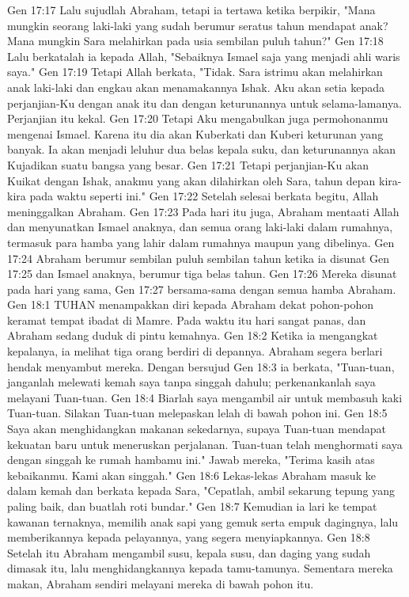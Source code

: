 Gen 17:17  Lalu sujudlah Abraham, tetapi ia tertawa ketika berpikir, "Mana mungkin seorang laki-laki yang sudah berumur seratus tahun mendapat anak? Mana mungkin Sara melahirkan pada usia sembilan puluh tahun?"
Gen 17:18  Lalu berkatalah ia kepada Allah, "Sebaiknya Ismael saja yang menjadi ahli waris saya."
Gen 17:19  Tetapi Allah berkata, "Tidak. Sara istrimu akan melahirkan anak laki-laki dan engkau akan menamakannya Ishak. Aku akan setia kepada perjanjian-Ku dengan anak itu dan dengan keturunannya untuk selama-lamanya. Perjanjian itu kekal.
Gen 17:20  Tetapi Aku mengabulkan juga permohonanmu mengenai Ismael. Karena itu dia akan Kuberkati dan Kuberi keturunan yang banyak. Ia akan menjadi leluhur dua belas kepala suku, dan keturunannya akan Kujadikan suatu bangsa yang besar.
Gen 17:21  Tetapi perjanjian-Ku akan Kuikat dengan Ishak, anakmu yang akan dilahirkan oleh Sara, tahun depan kira-kira pada waktu seperti ini."
Gen 17:22  Setelah selesai berkata begitu, Allah meninggalkan Abraham.
Gen 17:23  Pada hari itu juga, Abraham mentaati Allah dan menyunatkan Ismael anaknya, dan semua orang laki-laki dalam rumahnya, termasuk para hamba yang lahir dalam rumahnya maupun yang dibelinya.
Gen 17:24  Abraham berumur sembilan puluh sembilan tahun ketika ia disunat
Gen 17:25  dan Ismael anaknya, berumur tiga belas tahun.
Gen 17:26  Mereka disunat pada hari yang sama,
Gen 17:27  bersama-sama dengan semua hamba Abraham.
Gen 18:1  TUHAN menampakkan diri kepada Abraham dekat pohon-pohon keramat tempat ibadat di Mamre. Pada waktu itu hari sangat panas, dan Abraham sedang duduk di pintu kemahnya.
Gen 18:2  Ketika ia mengangkat kepalanya, ia melihat tiga orang berdiri di depannya. Abraham segera berlari hendak menyambut mereka. Dengan bersujud
Gen 18:3  ia berkata, "Tuan-tuan, janganlah melewati kemah saya tanpa singgah dahulu; perkenankanlah saya melayani Tuan-tuan.
Gen 18:4  Biarlah saya mengambil air untuk membasuh kaki Tuan-tuan. Silakan Tuan-tuan melepaskan lelah di bawah pohon ini.
Gen 18:5  Saya akan menghidangkan makanan sekedarnya, supaya Tuan-tuan mendapat kekuatan baru untuk meneruskan perjalanan. Tuan-tuan telah menghormati saya dengan singgah ke rumah hambamu ini." Jawab mereka, "Terima kasih atas kebaikanmu. Kami akan singgah."
Gen 18:6  Lekas-lekas Abraham masuk ke dalam kemah dan berkata kepada Sara, "Cepatlah, ambil sekarung tepung yang paling baik, dan buatlah roti bundar."
Gen 18:7  Kemudian ia lari ke tempat kawanan ternaknya, memilih anak sapi yang gemuk serta empuk dagingnya, lalu memberikannya kepada pelayannya, yang segera menyiapkannya.
Gen 18:8  Setelah itu Abraham mengambil susu, kepala susu, dan daging yang sudah dimasak itu, lalu menghidangkannya kepada tamu-tamunya. Sementara mereka makan, Abraham sendiri melayani mereka di bawah pohon itu.
